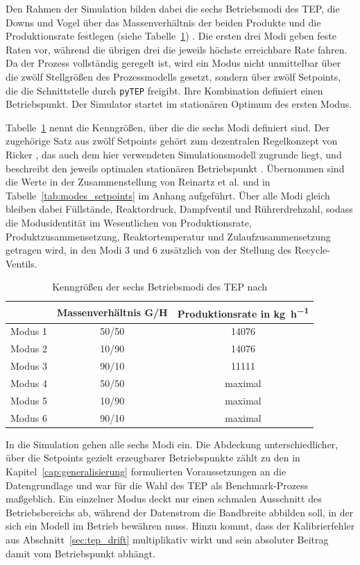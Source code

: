 Den Rahmen der Simulation bilden dabei die sechs Betriebsmodi des \ac{TEP}, die Downs und Vogel über das Massenverhältnis der beiden Produkte und die Produktionsrate festlegen (siehe Tabelle~\ref{tab:modes}) \cite{downs.1993}. Die ersten drei Modi geben feste Raten vor, während die übrigen drei die jeweils höchste erreichbare Rate fahren. Da der Prozess vollständig geregelt ist, wird ein Modus nicht unmittelbar über die zwölf Stellgrößen des Prozessmodells gesetzt, sondern über zwölf Setpoints, die die Schnittstelle durch \texttt{pyTEP} freigibt. Ihre Kombination definiert einen Betriebspunkt. Der Simulator startet im stationären Optimum des ersten Modus. \par
%
Tabelle~\ref{tab:modes} nennt die Kenngrößen, über die die sechs Modi definiert sind. Der zugehörige Satz aus zwölf Setpoints gehört zum dezentralen Regelkonzept von Ricker \cite{ricker.1996}, das auch dem hier verwendeten Simulationsmodell zugrunde liegt, und beschreibt den jeweils optimalen stationären Betriebspunkt \cite{ricker.1995}. Übernommen sind die Werte in der Zusammenstellung von Reinartz et al. \cite{reinartz.2021} und in Tabelle~\ref{tab:modes_setpoints} im Anhang aufgeführt. Über alle Modi gleich bleiben dabei Füllstände, Reaktordruck, Dampfventil und Rührerdrehzahl, sodass die Modusidentität im Wesentlichen von Produktionsrate, Produktzusammensetzung, Reaktortemperatur und Zulaufzusammensetzung getragen wird, in den Modi 3 und 6 zusätzlich von der Stellung des Recycle-Ventils. \par
%
\begin{table}[tb]
\centering
\renewcommand{\arraystretch}{1.2}
\begin{tabular}{l c c}
\toprule
& \textbf{Massenverhältnis G/H} & \textbf{Produktionsrate in \si{\kilo\gram\per\hour}} \\
\midrule
Modus 1 & 50/50 & 14076   \\
Modus 2 & 10/90 & 14076   \\
Modus 3 & 90/10 & 11111   \\
Modus 4 & 50/50 & maximal \\
Modus 5 & 10/90 & maximal \\
Modus 6 & 90/10 & maximal \\
\bottomrule
\end{tabular}
\caption{Kenngrößen der sechs Betriebsmodi des \ac{TEP} nach \cite{downs.1993}}
\label{tab:modes}
\end{table}
%
In die Simulation gehen alle sechs Modi ein. Die Abdeckung unterschiedlicher, über die Setpoints gezielt erzeugbarer Betriebspunkte zählt zu den in Kapitel~\ref{cap:generalisierung} formulierten Voraussetzungen an die Datengrundlage und war für die Wahl des \ac{TEP} als Benchmark-Prozess maßgeblich. Ein einzelner Modus deckt nur einen schmalen Ausschnitt des Betriebsbereichs ab, während der Datenstrom die Bandbreite abbilden soll, in der sich ein Modell im Betrieb bewähren muss. Hinzu kommt, dass der Kalibrierfehler aus Abschnitt~\ref{sec:tep_drift} multiplikativ wirkt und sein absoluter Beitrag damit vom Betriebspunkt abhängt. \par
